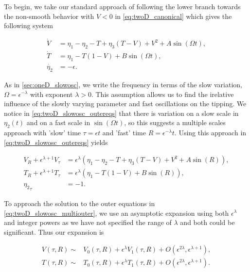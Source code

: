 To begin, we take our standard approach of following the lower branch towards the non-smooth behavior with $V<0$ in \eqref{eq:twoD_canonical} which gives the following system 

\begin{equation}\label{eq:twoD_slowosc_outereqs}
 \begin{aligned}
  \dot{V} & = \eta_1-\eta_2-T+\eta_3(T-V)+V^2+A\sin(\Omega t), \\
  \dot{T} & = \eta_1-T(1-V)+B\sin(\Omega t), \\
 \dot{\eta_2} & = -\epsilon.
 \end{aligned}
\end{equation}

As in \autoref{sec:oneD_slowosc}, we write the frequency in terms of the slow variation, $\Omega = \epsilon^{-\lambda}$ with exponent $\lambda>0$. This assumption allows us to find the irelative influence of the slowly varying parameter and fast oscillations on the tipping. We notice in \eqref{eq:twoD_slowosc_outereqs} that there is variation on a slow scale in $\eta_2(t)$ and on a fast scale in $\sin(\Omega t)$, so this suggests a multiple scales approach with 'slow' time $\tau = \epsilon t$ and 'fast' time $R=\epsilon^{-\lambda}t$. Using this approach in \eqref{eq:twoD_slowosc_outereqs} yields

\begin{equation}\label{eq:twoD_slowosc_multiouter}
 \begin{aligned}
V_R+\epsilon^{\lambda+1}V_\tau & = \epsilon^{\lambda} \left(\eta_1-\eta_2-		T+\eta_3(T-V)+V^2+A\sin(R)\right), \\
T_R+\epsilon^{\lambda+1}T_\tau & = \epsilon^{\lambda}\left( \eta_1-T(1-		 V)+B\sin(R)\right), \\
	{\eta_2}_\tau & = -1.
\end{aligned}
\end{equation}
 
To approach the solution to the outer equations in \eqref{eq:twoD_slowosc_multiouter}, we use an asymptotic expansion using both $\epsilon^\lambda$ and integer powers as we have not specified the range of $\lambda$ and both could be significant. Thus our expansion is

\begin{equation}\label{eq:twoD_slowosc_outerexpansion}
	\begin{aligned}
		V(\tau,R)\sim& V_0(\tau,R)+\epsilon^\lambda 	V_1(\tau,R)+O(\epsilon^{2\lambda},\epsilon^{\lambda+1}),\\
    T(\tau,R)\sim& T_0(\tau,R)+\epsilon^\lambda T_1(\tau,R)+O(\epsilon^{2\lambda},\epsilon^{\lambda+1}).
	\end{aligned}
\end{equation}

